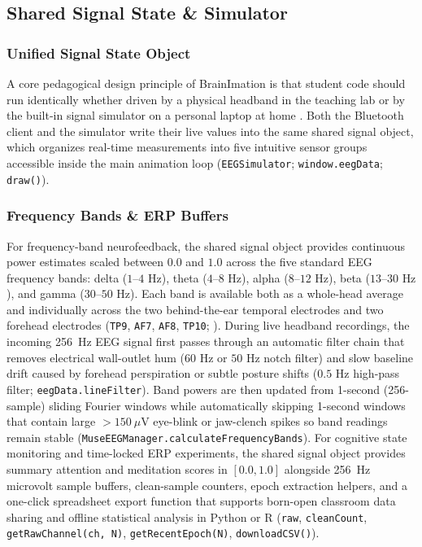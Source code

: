 \documentclass[11pt]{article}
\begin{document}
\subsection{Shared Signal State \& Simulator}

\subsubsection{Unified Signal State Object}
A core pedagogical design principle of BrainImation is that student code should run identically whether driven by a physical headband in the teaching lab or by the built-in signal simulator on a personal laptop at home \citep{deleeuw2023simulating}. Both the Bluetooth client and the simulator write their live values into the same shared signal object, which organizes real-time measurements into five intuitive sensor groups accessible inside the main animation loop (\texttt{EEGSimulator}; \texttt{window.eegData}; \texttt{draw()}).

\subsubsection{Frequency Bands \& ERP Buffers}
For frequency-band neurofeedback, the shared signal object provides continuous power estimates scaled between $0.0$ and $1.0$ across the five standard EEG frequency bands: delta ($1\text{--}4\text{ Hz}$), theta ($4\text{--}8\text{ Hz}$), alpha ($8\text{--}12\text{ Hz}$), beta ($13\text{--}30\text{ Hz}$), and gamma ($30\text{--}50\text{ Hz}$). Each band is available both as a whole-head average and individually across the two behind-the-ear temporal electrodes and two forehead electrodes (\texttt{TP9}, \texttt{AF7}, \texttt{AF8}, \texttt{TP10}; \citealp{cannard2021validating,sabio2024scoping}). During live headband recordings, the incoming 256~Hz EEG signal first passes through an automatic filter chain that removes electrical wall-outlet hum ($60\text{ Hz}$ or $50\text{ Hz}$ notch filter) and slow baseline drift caused by forehead perspiration or subtle posture shifts ($0.5\text{ Hz}$ high-pass filter; \texttt{eegData.lineFilter}). Band powers are then updated from 1-second (256-sample) sliding Fourier windows while automatically skipping 1-second windows that contain large $>150\ \mu\text{V}$ eye-blink or jaw-clench spikes so band readings remain stable (\texttt{MuseEEGManager.calculateFrequencyBands}). For cognitive state monitoring and time-locked ERP experiments, the shared signal object provides summary attention and meditation scores in $[0.0, 1.0]$ alongside 256~Hz microvolt sample buffers, clean-sample counters, epoch extraction helpers, and a one-click spreadsheet export function that supports born-open classroom data sharing and offline statistical analysis in Python or R \citep{deleeuw2024datapipe,makowski2021neurokit2,cannard2024brainbeats} (\texttt{raw}, \texttt{cleanCount}, \texttt{getRawChannel(ch, N)}, \texttt{getRecentEpoch(N)}, \texttt{downloadCSV()}).
\end{document}
